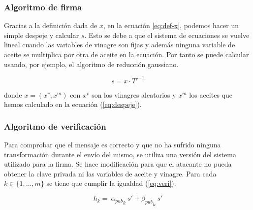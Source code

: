 \subsubsection{Algoritmo de firma}

Gracias a la definición dada de $x$, en la ecuación \ref{eq:def-x}, podemos hacer un simple despeje y calcular $s$. Esto se debe a que el sistema de ecuaciones se vuelve lineal cuando las variables de vinagre son fijas y además ninguna variable de aceite se multiplica por otra de aceite en la ecuación. Por tanto se puede calcular usando, por ejemplo, el algoritmo de reducción gaussiano.

\begin{equation}
	s = x \cdot T'^{-1}
\end{equation}

donde $x = (x^v, x^m)$ con $x^v$ son los vinagres aleatorios y $x^m$ los aceites que hemos calculado en la ecuación (\ref{eq:despeje}).




\subsubsection{Algoritmo de verificación}

Para comprobar que el mensaje es correcto y que no ha sufrido ninguna transformación durante el envío del mismo, se utiliza una versión del sistema utilizado para la firma. Se hace modificación para que el atacante no pueda obtener la clave privada ni las variables de aceite y vinagre. Para cada $k \in  \{1,\dots, m\}$ se tiene que cumplir la igualdad (\ref{eq:veri}).


\begin{equation}\label{eq:veri}
	h_k = \ {\alpha_{pub}}_k \ s' + {\beta_{pub}}_{k} \ s'
\end{equation}


